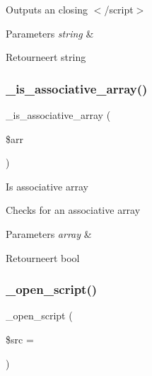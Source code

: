 Outputs an closing $<$/script$>$


\begin{DoxyParams}{Parameters}
{\em string} & \\
\hline
\end{DoxyParams}
\begin{DoxyReturn}{Retourneert}
string 
\end{DoxyReturn}
\mbox{\label{class_c_i___javascript_aa37c9b1b7e2898fe21a0deaace09b156}} 
\subsubsection{\texorpdfstring{\_is\_associative\_array()}{\_is\_associative\_array()}}
{\footnotesize\ttfamily \+\_\+is\+\_\+associative\+\_\+array (\begin{DoxyParamCaption}\item[{}]{\$arr }\end{DoxyParamCaption})\hspace{0.3cm}{\ttfamily [protected]}}

Is associative array

Checks for an associative array


\begin{DoxyParams}{Parameters}
{\em array} & \\
\hline
\end{DoxyParams}
\begin{DoxyReturn}{Retourneert}
bool 
\end{DoxyReturn}
\mbox{\label{class_c_i___javascript_ab90b7bf672ff305aa302ced7c8255762}} 
\subsubsection{\texorpdfstring{\_open\_script()}{\_open\_script()}}
{\footnotesize\ttfamily \+\_\+open\+\_\+script (\begin{DoxyParamCaption}\item[{}]{\$src = {\ttfamily \textquotesingle{}\textquotesingle{}} }\end{DoxyParamCaption})\hspace{0.3cm}{\ttfamily [protected]}}

